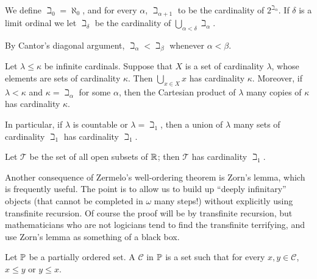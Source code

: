 \begin{definition}\label{beth dfn}
We define $\beth_0 = \aleph_0$, and for every $\alpha$, $\beth_{\alpha + 1}$ to be the cardinality of $2^{\beth_\alpha}$.
If $\delta$ is a limit ordinal we let $\beth_\delta$ be the cardinality of $\bigcup_{\alpha < \delta} \beth_\alpha$.
\end{definition}

\begin{subsec}
By Cantor's diagonal argument, $\beth_{\alpha} < \beth_\beta$ whenever $\alpha < \beta$.
\end{subsec}

\begin{theorem}\label{cardinal arithmetic trivial}
Let $\lambda \leq \kappa$ be infinite cardinals.
Suppose that $X$ is a set of cardinality $\lambda$, whose elements are sets of cardinality $\kappa$. Then $\bigcup_{x \in X} x$ has cardinality $\kappa$.
Moreover, if $\lambda < \kappa$ and $\kappa = \beth_\alpha$ for some $\alpha$, then the Cartesian product of $\lambda$ many copies of $\kappa$ has cardinality $\kappa$.
\end{theorem}

\begin{subsec}
In particular, if $\lambda$ is countable or $\lambda = \beth_1$, then a union of $\lambda$ many sets of cardinality $\beth_1$ has cardinality $\beth_1$.
\end{subsec}

\begin{theorem}\label{cardinality of topology}
Let $\mathcal T$ be the set of all open subsets of $\mathbb{R}$; then $\mathcal T$ has cardinality $\beth_1$.
\end{theorem}

\begin{subsec}
Another consequence of Zermelo's well-ordering theorem is Zorn's lemma, which is frequently useful.
The point is to allow us to build up ``deeply infinitary'' objects (that cannot be completed in $\omega$ many steps!) without explicitly using transfinite recursion.
Of course the proof will be by transfinite recursion, but mathematicians who are not logicians tend to find the transfinite terrifying, and use Zorn's lemma as something of a black box.
\end{subsec}

\begin{definition}
Let $\mathbb{P}$ be a partially ordered set. A  $\mathcal C$ in $\mathbb{P}$ is a set such that for every $x, y \in \mathcal C$, $x \leq y$ or $y \leq x$.
\end{definition}

